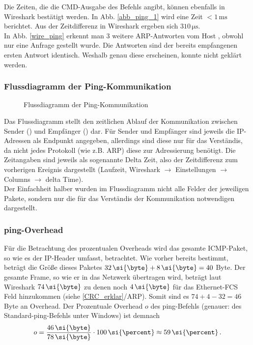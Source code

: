 Die Zeiten, die die CMD-Ausgabe des Befehls angibt, können ebenfalls in Wireshark bestätigt werden. In Abb. \ref{abb_ping_1} wird eine Zeit $<1\,\si{\milli\second}$ berichtet. Aus der Zeitdifferenz in Wireshark ergeben sich $310 \,\si{\micro\second}$.\\

In Abb. \ref{wire_ping} erkennt man 3 weitere ARP-Antworten vom Host , obwohl nur eine Anfrage gestellt wurde. Die Antworten sind der bereits empfangenen ersten Antwort identisch. Weshalb genau diese erscheinen, konnte nicht geklärt werden.\\

\subsubsection{Flussdiagramm der Ping-Kommunikation}


\begin{figure}[H]
\centering
    \caption{Flussdiagramm der Ping-Kommunikation}
\end{figure}

Das Flussdiagramm stellt den zeitlichen Ablauf der Kommunikation zwischen Sender () und Empfänger () dar. Für Sender und Empfänger sind jeweils die IP-Adressen als Endpunkt angegeben, allerdings sind diese nur für das Verständis, da nicht jedes Protokoll (wie z.B. ARP) diese zur Adressierung benötigt. Die Zeitangaben sind jeweils als sogenannte \glqq Delta Zeit\grqq, also der Zeitdifferenz zum vorherigen Ereignis dargestellt (Laufzeit, Wireshark $\rightarrow$ Einstellungen $\rightarrow$ Columns $\rightarrow$ delta Time).\\

Der Einfachheit halber wurden im Flussdiagramm nicht alle Felder der jeweiligen Pakete, sondern nur die für das Verständis der Kommunikation notwendigen dargestellt.

\subsubsection{ping-Overhead}
Für die Betrachtung des prozentualen Overheads wird das gesamte ICMP-Paket, so wie es der IP-Header umfasst, betrachtet. Wie vorher bereits bestimmt, beträgt die Größe dieses Paketes $32 \, \si{\byte} + 8 \, \si{\byte} = 40$ Byte. Der gesamte Frame, so wie er in das Netzwerk übertragen wird, beträgt laut Wireshark $74 \, \si{\byte}$ zu denen noch $4 \, \si{\byte}$ für das Ethernet-FCS Feld hinzukommen (siehe \ref{CRC_erklar}/ARP). Somit sind es $74 + 4 - 32 = 46$ Byte an Overhead. Der Prozentuale Overhead $o$ des ping-Befehls (genauer: des Standard-ping-Befehls unter Windows) ist demnach
\[o = \frac{46 \, \si{\byte}}{78 \, \si{\byte}} \cdot 100 \, \si{\percent} \approx 59 \, \si{\percent}\,.\]
